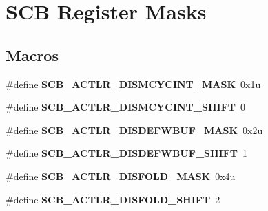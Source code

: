 \hypertarget{group___s_c_b___register___masks}{}\section{S\+C\+B Register Masks}
\label{group___s_c_b___register___masks}
\subsection*{Macros}
\begin{DoxyCompactItemize}
\item 
\hypertarget{group___s_c_b___register___masks_gaae602d6292782f5741df72e5343d314a}{}\#define {\bfseries S\+C\+B\+\_\+\+A\+C\+T\+L\+R\+\_\+\+D\+I\+S\+M\+C\+Y\+C\+I\+N\+T\+\_\+\+M\+A\+S\+K}~0x1u\label{group___s_c_b___register___masks_gaae602d6292782f5741df72e5343d314a}

\item 
\hypertarget{group___s_c_b___register___masks_gaa90446250553adb9c3d3825a1a2d2529}{}\#define {\bfseries S\+C\+B\+\_\+\+A\+C\+T\+L\+R\+\_\+\+D\+I\+S\+M\+C\+Y\+C\+I\+N\+T\+\_\+\+S\+H\+I\+F\+T}~0\label{group___s_c_b___register___masks_gaa90446250553adb9c3d3825a1a2d2529}

\item 
\hypertarget{group___s_c_b___register___masks_ga4c490bd1cf152dfc561b16ecd0c299b9}{}\#define {\bfseries S\+C\+B\+\_\+\+A\+C\+T\+L\+R\+\_\+\+D\+I\+S\+D\+E\+F\+W\+B\+U\+F\+\_\+\+M\+A\+S\+K}~0x2u\label{group___s_c_b___register___masks_ga4c490bd1cf152dfc561b16ecd0c299b9}

\item 
\hypertarget{group___s_c_b___register___masks_gab4462053d8fad6812d5d1ac5c221bfb1}{}\#define {\bfseries S\+C\+B\+\_\+\+A\+C\+T\+L\+R\+\_\+\+D\+I\+S\+D\+E\+F\+W\+B\+U\+F\+\_\+\+S\+H\+I\+F\+T}~1\label{group___s_c_b___register___masks_gab4462053d8fad6812d5d1ac5c221bfb1}

\item 
\hypertarget{group___s_c_b___register___masks_gaf6db9bf675e72117781be485f701b7d0}{}\#define {\bfseries S\+C\+B\+\_\+\+A\+C\+T\+L\+R\+\_\+\+D\+I\+S\+F\+O\+L\+D\+\_\+\+M\+A\+S\+K}~0x4u\label{group___s_c_b___register___masks_gaf6db9bf675e72117781be485f701b7d0}

\item 
\hypertarget{group___s_c_b___register___masks_gadd11de163d74ebcd19b1569980c26abc}{}\#define {\bfseries S\+C\+B\+\_\+\+A\+C\+T\+L\+R\+\_\+\+D\+I\+S\+F\+O\+L\+D\+\_\+\+S\+H\+I\+F\+T}~2\label{group___s_c_b___register___masks_gadd11de163d74ebcd19b1569980c26abc}


\end{DoxyCompactItemize}
